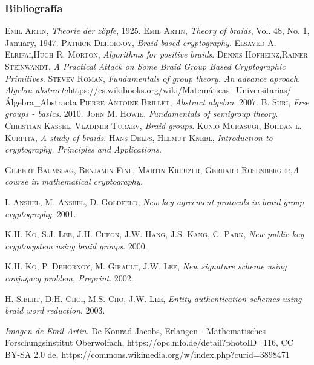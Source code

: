 \documentclass{beamer}
\begin{document}
\begin{frame}
\frametitle{Bibliografía}

\begin{thebibliography}{X}
\textsc{Emil Artin}, \textit{Theorie der z\"opfe}, 1925.
\textsc{Emil Artin}, \textit{Theory of braids}, Vol. 48, No. 1, January, 1947.
\textsc{Patrick Dehornoy}, \textit{Braid-based cryptography}.
\textsc{Elsayed A. Elrifai},\textsc{Hugh R. Morton}, \textit{Algorithms for positive braids}.
\textsc{Dennis Hofheinz},\textsc{Rainer Steinwandt}, \textit{A Practical Attack on Some Braid Group Based
Cryptographic Primitives}.
\textsc{Stevev Roman}, \textit{Fundamentals of group theory. An advance aproach}.
\textit{Algebra abstracta}\newline https://es.wikibooks.org/wiki/Matemáticas\_Universitarias/Álgebra\_Abstracta
\textsc{Pierre Antoine Brillet}, \textit{Abstract algebra}. 2007.
\textsc{B. Suri}, \textit{Free groups - basics}. 2010.
\textsc{John M. Howie}, \textit{Fundamentals of semigroup theory}.
\textsc{Christian Kassel}, \textsc{Vladimir Turaev}, \textit{Braid groups}.
\textsc{Kunio Murasugi}, \textsc{Bohdan l. Kurpita}, \textit{A study of braids}.
\textsc{Hans Delfs}, \textsc{Helmut Knebl}, \textit{Introduction to cryptography. Principles and Applications.}

\textsc{Gilbert Baumslag}, \textsc{Benjamin Fine},  \textsc{Martin Kreuzer}, \textsc{Gerhard Rosenberger},\textit{A course in mathematical cryptography.}

\textsc{I. Anshel}, \textsc{M. Anshel}, \textsc{D. Goldfeld}, \textit{New key agreement protocols in braid group cryptography}. 2001.


\textsc{K.H. Ko}, \textsc{S.J. Lee}, \textsc{J.H. Cheon}, \textsc{J.W. Hang}, \textsc{J.S. Kang}, \textsc{C. Park}, \textit{New public-key cryptosystem using braid groups}. 2000.

\textsc{K.H. Ko}, \textsc{P. Dehornoy}, \textsc{M. Girault}, \textsc{J.W. Lee}, \textit{New signature scheme using conjugacy problem, Preprint}. 2002.

\textsc{H. Sibert}, \textsc{D.H. Choi}, \textsc{M.S. Cho}, \textsc{J.W. Lee}, \textit{Entity authentication schemes using braid word reduction}. 2003.

\textit{Imagen de Emil Artin}. De Konrad Jacobs, Erlangen - Mathematisches Forschungsinstitut Oberwolfach, https://opc.mfo.de/detail?photoID=116, CC BY-SA 2.0 de, https://commons.wikimedia.org/w/index.php?curid=3898471



\end{thebibliography}
\end{frame}
\end{document}
